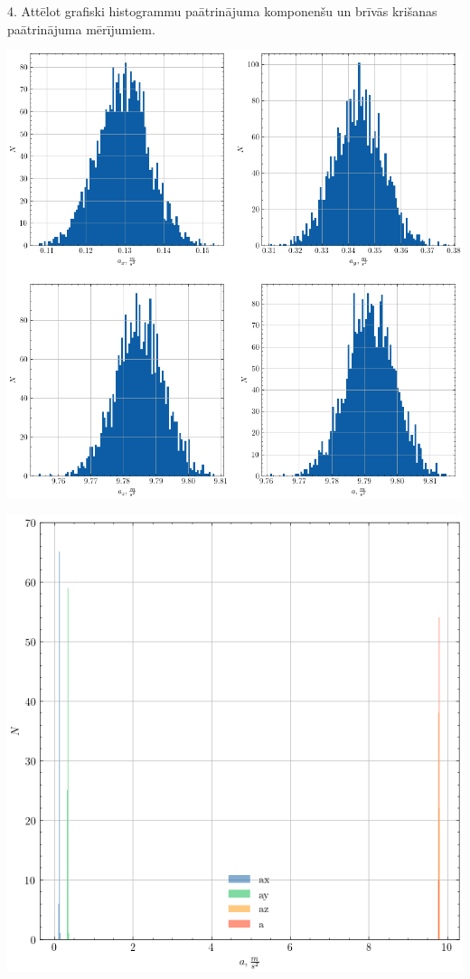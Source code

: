 \documentclass[12pt]{article}
\begin{document}
4.	Attēlot grafiski histogrammu paātrinājuma komponenšu un brīvās krišanas paātrinājuma mērījumiem.
\begin{center}
    \includegraphics[width=1\textwidth]{Brīvās krišanas paātrinājuma g noteikšana2.png}
\end{center}

\begin{center}
    \includegraphics[width=1\textwidth]{Brīvās krišanas paātrinājuma g noteikšana3.png}
\end{center}
\end{document}
